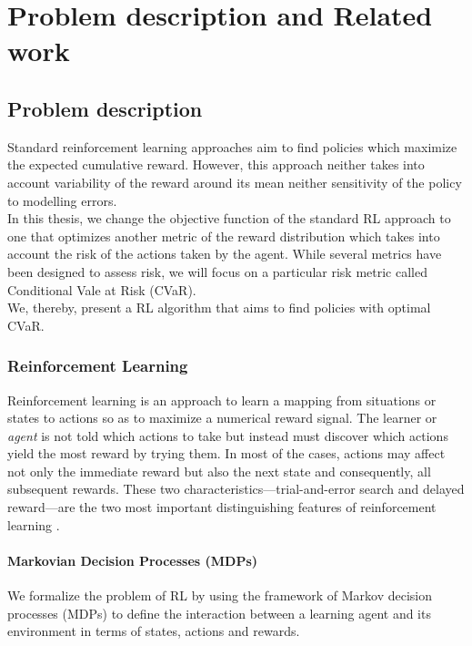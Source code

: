 \chapter{Problem description and Related work}
\label{sec:problem_description}
\section{Problem description}

Standard reinforcement learning approaches aim to find policies which maximize the expected cumulative reward.
However, this approach neither takes into account variability of the reward around its mean
neither sensitivity of the policy to modelling errors.\\
In this thesis, we change the objective function of the
standard RL approach to one that optimizes another metric of the reward distribution which
takes into account the risk of the actions taken by the agent.
While several metrics have been designed to assess risk, we will focus on a particular risk metric
called Conditional Vale at Risk (CVaR).\\
We, thereby, present a RL algorithm that aims to find policies with optimal CVaR.

\subsection{Reinforcement Learning}

Reinforcement learning is an approach to learn a mapping from situations or states to actions so as to maximize 
a numerical reward signal. The learner or \textit{agent} is not told which actions to take
but instead must discover which actions yield the most reward by trying them. In most of the cases,
actions may affect not only the immediate reward but also the next state and consequently, all subsequent rewards.
These two characteristics—trial-and-error search and delayed reward—are the two most important
distinguishing features of reinforcement learning \cite{Sutton1998}.

\subsubsection{Markovian Decision Processes (MDPs)}
We formalize the problem of RL by using the framework of Markov decision processes (MDPs)
to define the interaction between a learning agent and its environment in terms of states,
actions and rewards.

